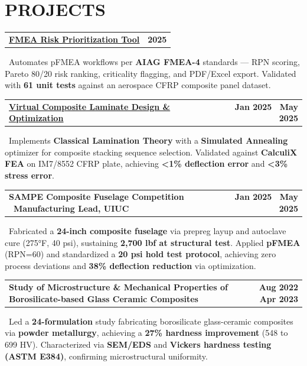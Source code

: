\documentclass[letterpaper,10pt]{extarticle}
\makeatletter
\newcommand{\expentry}[2]{%
  \vspace{4pt}%
  \noindent\begin{tabularx}{\textwidth}{@{}X r@{}}
    {\fontsize{11pt}{13pt}\selectfont\textbf{#1}} & {\fontsize{11pt}{13pt}\selectfont\textbf{#2}}
  \end{tabularx}%
  \vspace{4pt}%
}
\makeatother
\begin{document}
\section{PROJECTS}

\expentry{\href{https://github.com/Siddardth7/fmea-risk-analyzer}{\color{linkblue}\underline{FMEA Risk Prioritization Tool}}}{2025}
{\fontsize{10pt}{11pt}\selectfont \textbullet\ Automates pFMEA workflows per \textbf{AIAG FMEA-4} standards — RPN scoring, Pareto 80/20 risk ranking, criticality flagging, and PDF/Excel export. Validated with \textbf{61 unit tests} against an aerospace CFRP composite panel dataset.}

\expentry{\href{https://github.com/Siddardth7/Virtual-Composite-Design-Optimization}{\color{linkblue}\underline{Virtual Composite Laminate Design \& Optimization}}}{Jan 2025 \textbar\ May 2025}
{\fontsize{10pt}{11pt}\selectfont \textbullet\ Implements \textbf{Classical Lamination Theory} with a \textbf{Simulated Annealing} optimizer for composite stacking sequence selection. Validated against \textbf{CalculiX FEA} on IM7/8552 CFRP plate, achieving \textbf{\textless1\% deflection error} and \textbf{\textless3\% stress error}.}

\expentry{SAMPE Composite Fuselage Competition \textbar\ Manufacturing Lead, UIUC}{Jan 2025 \textbar\ May 2025}
{\fontsize{10pt}{11pt}\selectfont \textbullet\ Fabricated a \textbf{24-inch composite fuselage} via prepreg layup and autoclave cure (275°F, 40 psi), sustaining \textbf{2,700 lbf at structural test}. Applied \textbf{pFMEA} (RPN=60) and standardized a \textbf{20 psi hold test protocol}, achieving zero process deviations and \textbf{38\% deflection reduction} via optimization.}

\expentry{Study of Microstructure \& Mechanical Properties of Borosilicate-based Glass Ceramic Composites}{Aug 2022 \textbar\ Apr 2023}
{\fontsize{10pt}{11pt}\selectfont \textbullet\ Led a \textbf{24-formulation} study fabricating borosilicate glass-ceramic composites via \textbf{powder metallurgy}, achieving a \textbf{27\% hardness improvement} (548 to 699 HV). Characterized via \textbf{SEM/EDS} and \textbf{Vickers hardness testing (ASTM E384)}, confirming microstructural uniformity.}
\end{document}

